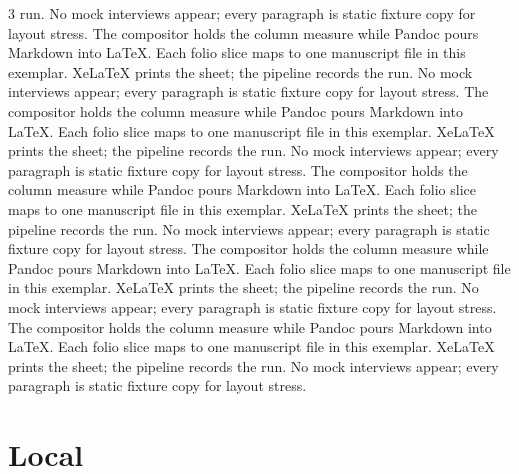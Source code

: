 \documentclass[
]{article}
\begin{document}
\begin{multicols}{3}
run. No mock interviews appear; every paragraph is static fixture copy
for layout stress. The compositor holds the column measure while Pandoc
pours Markdown into LaTeX. Each folio slice maps to one manuscript file
in this exemplar. XeLaTeX prints the sheet; the pipeline records the
run. No mock interviews appear; every paragraph is static fixture copy
for layout stress. The compositor holds the column measure while Pandoc
pours Markdown into LaTeX. Each folio slice maps to one manuscript file
in this exemplar. XeLaTeX prints the sheet; the pipeline records the
run. No mock interviews appear; every paragraph is static fixture copy
for layout stress. The compositor holds the column measure while Pandoc
pours Markdown into LaTeX. Each folio slice maps to one manuscript file
in this exemplar. XeLaTeX prints the sheet; the pipeline records the
run. No mock interviews appear; every paragraph is static fixture copy
for layout stress. The compositor holds the column measure while Pandoc
pours Markdown into LaTeX. Each folio slice maps to one manuscript file
in this exemplar. XeLaTeX prints the sheet; the pipeline records the
run. No mock interviews appear; every paragraph is static fixture copy
for layout stress. The compositor holds the column measure while Pandoc
pours Markdown into LaTeX. Each folio slice maps to one manuscript file
in this exemplar. XeLaTeX prints the sheet; the pipeline records the
run. No mock interviews appear; every paragraph is static fixture copy
for layout stress.

\end{multicols}

\newpage

\section{Local}\label{local}
\end{document}
